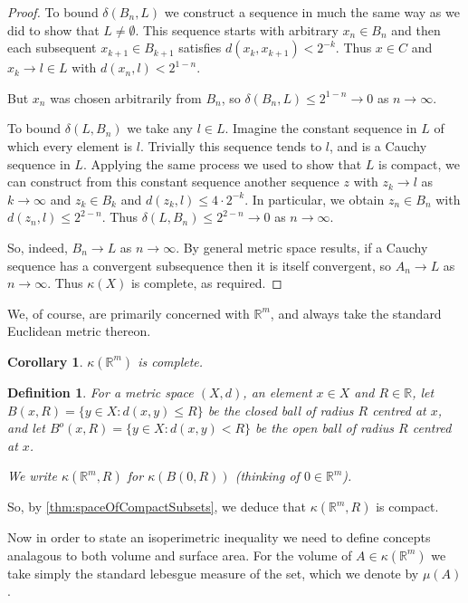 \documentclass[a4paper,11pt]{article}
\newcommand{\bbR}{\mathbb{R}}
\newtheorem{corollary}[thm]{Corollary}
\newtheorem{defn}[thm]{Definition}
\begin{document}
\begin{proof}
To bound $\delta(B_n,L)$ we construct a sequence in much the same way as we did
to show that $L\not=\emptyset$.  This sequence starts with arbitrary $x_n\in
B_n$ and then each subsequent $x_{k+1}\in B_{k+1}$ satisfies
$d(x_k,x_{k+1})<2^{-k}$.  Thus $x\in C$ and $x_k\to l\in L$ with
$d(x_n,l)<2^{1-n}$.

But $x_n$ was chosen arbitrarily from $B_n$, so $\delta(B_n,L)\leq2^{1-n}\to0$
as $n\to\infty$.

To bound $\delta(L,B_n)$ we take any $l\in L$.  Imagine the constant sequence
in $L$ of which every element is $l$.  Trivially this sequence tends to $l$,
and is a Cauchy sequence in $L$.  Applying the same process we used to show
that $L$ is compact, we can construct from this constant sequence another
sequence $z$ with $z_k\to l$ as $k\to\infty$ and $z_k\in B_k$ and
$d(z_k,l)\leq4\cdot2^{-k}$.  In particular, we obtain $z_n\in B_n$ with
$d(z_n,l)\leq2^{2-n}$.  Thus $\delta(L,B_n)\leq2^{2-n}\to0$ as $n\to\infty$.

So, indeed, $B_n\to L$ as $n\to\infty$.  By general metric space results, if a
Cauchy sequence has a convergent subsequence then it is itself convergent, so
$A_n\to L$ as $n\to\infty$.  Thus $\kappa(X)$ is complete, as required.
\end{proof}

We, of course, are primarily concerned with $\bbR^m$, and always take
the standard Euclidean metric thereon.

\begin{corollary}
$\kappa(\bbR^m)$ is complete.
\end{corollary}

\begin{defn}
For a metric space $(X,d)$, an element $x\in X$ and $R\in\bbR$, let
$B(x,R)=\{y\in X:d(x,y)\leq R\}$ be the \emph{closed ball}
of radius $R$ centred at $x$, and let
$B^o(x,R)=\{y\in X:d(x,y)<R\}$ be the \emph{open ball}
of radius $R$ centred at $x$.

We write $\kappa(\bbR^m,R)$ for $\kappa(B(0,R))$ (thinking of $0\in\bbR^m$).
\end{defn}

So, by \ref{thm:spaceOfCompactSubsets}, we deduce that $\kappa(\bbR^m,R)$ is
compact.

Now in order to state an isoperimetric inequality we need to define concepts
analagous to both volume and surface area.  For the volume of
$A\in\kappa(\bbR^m)$ we take simply the standard lebesgue measure of the set,
which we denote by $\mu(A)$.
\end{document}
